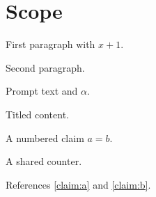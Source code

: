\documentclass{article}
\begin{document}
\section{Scope}
\begin{mdframed}First paragraph with $x+1$.

Second paragraph.\end{mdframed}
\begin{promptbox}Prompt text and $\alpha$.\end{promptbox}
\begin{mdframed}[frametitle={A title with $y$},backgroundcolor=green]
Titled content.
\end{mdframed}
\begin{claim}[Named]\label{claim:a}A numbered claim $a=b$.\end{claim}
\begin{corollary}\label{claim:b}A shared counter.\end{corollary}
References \ref{claim:a} and \ref{claim:b}.
\end{document}
